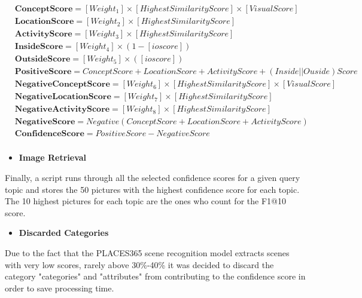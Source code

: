     \begin{align*}
        &\textbf{ConceptScore}  =   [Weight_1]\times[HighestSimilarityScore]\times[VisualScore] \\ 
        &\textbf{LocationScore} = [Weight_2]\times[HighestSimilarityScore] \\ 
      &\textbf{ActivityScore} =  [Weight_3]\times[HighestSimilarityScore]\\
        &\textbf{InsideScore}   =  [Weight_4]\times(1-[ioscore])\\
        &\textbf{OutsideScore}  =  [Weight_5]\times([ioscore])\\
        &\textbf{PositiveScore}  =  ConceptScore + LocationScore + ActivityScore + (Inside||Ouside)Score\\
        &\textbf{NegativeConceptScore}  =  [Weight_6]\times[HighestSimilarityScore]\times[VisualScore]\\
        &\textbf{NegativeLocationScore}  =  [Weight_7]\times[HighestSimilarityScore]\\
        &\textbf{NegativeActivityScore}  =  [Weight_8]\times[HighestSimilarityScore]\\
        &\textbf{NegativeScore}  =  Negative(ConceptScore + LocationScore + ActivityScore) \\
        &\textbf{ConfidenceScore}  =  PositiveScore - NegativeScore\\
  \end{align*}
  

  \begin{itemize}
    \item \textbf{Image Retrieval}
  \end{itemize}

    Finally, a script runs through all the selected confidence scores for a given
    query topic and stores the 50 pictures with the highest confidence score for each topic. The 10 highest pictures for each topic are the ones who count for the F1@10 score.
       
    \begin{itemize}
      \item \textbf{Discarded Categories}
    \end{itemize}
    
    Due to the fact that the PLACES365 scene recognition model extracts scenes with very low scores, rarely above 30\%-40\% it was decided to discard the category "categories" and "attributes" from contributing to the confidence score in order to save processing time.

